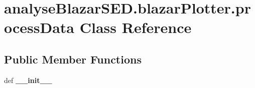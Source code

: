 \hypertarget{classanalyseBlazarSED_1_1blazarPlotter_1_1processData}{\section{analyse\-Blazar\-S\-E\-D.\-blazar\-Plotter.\-process\-Data Class Reference}
\label{classanalyseBlazarSED_1_1blazarPlotter_1_1processData}
}
\subsection*{Public Member Functions}
\begin{DoxyCompactItemize}
\item 
\hypertarget{classanalyseBlazarSED_1_1blazarPlotter_1_1processData_ab9debc25000857159c0a1038f4be926d}{def {\bfseries \-\_\-\-\_\-init\-\_\-\-\_\-}}\label{classanalyseBlazarSED_1_1blazarPlotter_1_1processData_ab9debc25000857159c0a1038f4be926d}

\end{DoxyCompactItemize}
